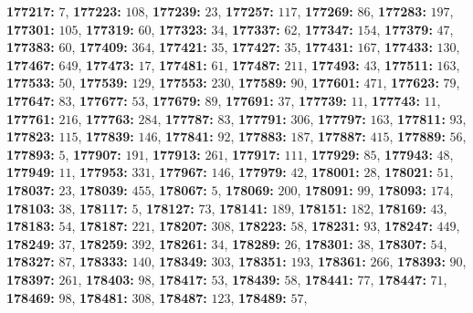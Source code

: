 \textsf{\bfseries 177217:} $7$, \textsf{\bfseries 177223:} $108$, \textsf{\bfseries 177239:} $23$, \textsf{\bfseries 177257:} $117$, \textsf{\bfseries 177269:} $86$, \textsf{\bfseries 177283:} $197$, \textsf{\bfseries 177301:} $105$, \textsf{\bfseries 177319:} $60$, \textsf{\bfseries 177323:} $34$, \textsf{\bfseries 177337:} $62$, \textsf{\bfseries 177347:} $154$, \textsf{\bfseries 177379:} $47$, \textsf{\bfseries 177383:} $60$, \textsf{\bfseries 177409:} $364$, \textsf{\bfseries 177421:} $35$, \textsf{\bfseries 177427:} $35$, \textsf{\bfseries 177431:} $167$, \textsf{\bfseries 177433:} $130$, \textsf{\bfseries 177467:} $649$, \textsf{\bfseries 177473:} $17$, \textsf{\bfseries 177481:} $61$, \textsf{\bfseries 177487:} $211$, \textsf{\bfseries 177493:} $43$, \textsf{\bfseries 177511:} $163$, \textsf{\bfseries 177533:} $50$, \textsf{\bfseries 177539:} $129$, \textsf{\bfseries 177553:} $230$, \textsf{\bfseries 177589:} $90$, \textsf{\bfseries 177601:} $471$, \textsf{\bfseries 177623:} $79$, \textsf{\bfseries 177647:} $83$, \textsf{\bfseries 177677:} $53$, \textsf{\bfseries 177679:} $89$, \textsf{\bfseries 177691:} $37$, \textsf{\bfseries 177739:} $11$, \textsf{\bfseries 177743:} $11$, \textsf{\bfseries 177761:} $216$, \textsf{\bfseries 177763:} $284$, \textsf{\bfseries 177787:} $83$, \textsf{\bfseries 177791:} $306$, \textsf{\bfseries 177797:} $163$, \textsf{\bfseries 177811:} $93$, \textsf{\bfseries 177823:} $115$, \textsf{\bfseries 177839:} $146$, \textsf{\bfseries 177841:} $92$, \textsf{\bfseries 177883:} $187$, \textsf{\bfseries 177887:} $415$, \textsf{\bfseries 177889:} $56$, \textsf{\bfseries 177893:} $5$, \textsf{\bfseries 177907:} $191$, \textsf{\bfseries 177913:} $261$, \textsf{\bfseries 177917:} $111$, \textsf{\bfseries 177929:} $85$, \textsf{\bfseries 177943:} $48$, \textsf{\bfseries 177949:} $11$, \textsf{\bfseries 177953:} $331$, \textsf{\bfseries 177967:} $146$, \textsf{\bfseries 177979:} $42$, \textsf{\bfseries 178001:} $28$, \textsf{\bfseries 178021:} $51$, \textsf{\bfseries 178037:} $23$, \textsf{\bfseries 178039:} $455$, \textsf{\bfseries 178067:} $5$, \textsf{\bfseries 178069:} $200$, \textsf{\bfseries 178091:} $99$, \textsf{\bfseries 178093:} $174$, \textsf{\bfseries 178103:} $38$, \textsf{\bfseries 178117:} $5$, \textsf{\bfseries 178127:} $73$, \textsf{\bfseries 178141:} $189$, \textsf{\bfseries 178151:} $182$, \textsf{\bfseries 178169:} $43$, \textsf{\bfseries 178183:} $54$, \textsf{\bfseries 178187:} $221$, \textsf{\bfseries 178207:} $308$, \textsf{\bfseries 178223:} $58$, \textsf{\bfseries 178231:} $93$, \textsf{\bfseries 178247:} $449$, \textsf{\bfseries 178249:} $37$, \textsf{\bfseries 178259:} $392$, \textsf{\bfseries 178261:} $34$, \textsf{\bfseries 178289:} $26$, \textsf{\bfseries 178301:} $38$, \textsf{\bfseries 178307:} $54$, \textsf{\bfseries 178327:} $87$, \textsf{\bfseries 178333:} $140$, \textsf{\bfseries 178349:} $303$, \textsf{\bfseries 178351:} $193$, \textsf{\bfseries 178361:} $266$, \textsf{\bfseries 178393:} $90$, \textsf{\bfseries 178397:} $261$, \textsf{\bfseries 178403:} $98$, \textsf{\bfseries 178417:} $53$, \textsf{\bfseries 178439:} $58$, \textsf{\bfseries 178441:} $77$, \textsf{\bfseries 178447:} $71$, \textsf{\bfseries 178469:} $98$, \textsf{\bfseries 178481:} $308$, \textsf{\bfseries 178487:} $123$, \textsf{\bfseries 178489:} $57$, 

